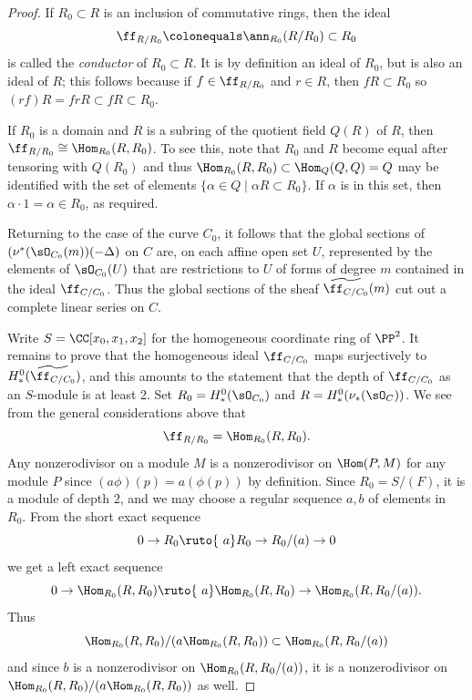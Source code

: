 \begin{proof}
If $R_{0}\subset R$ is an inclusion of commutative rings, then the ideal
$$\ff_{R/R_{0}} \colonequals  \ann_{R_{0}}(R/R_{0})\subset R_{0}$$ 
is called the \emph{conductor} of $R_{0}\subset R$.
%
It is by
definition an ideal of $R_{0}$, but is also an ideal of $R$; this follows
because if $f\in \ff_{R/R_{0}}$ and $r\in R$, then $fR\subset R_{0}$ so
 $(rf)R = frR \subset fR \subset R_{0}$.

If $R_{0}$ is a domain and $R$ is a subring of the quotient field $Q(R)$
of $R$, then
 $\ff_{R/R_{0}} \cong \Hom_{R_{0}}(R, R_{0})$. To see this, note that
 $R_{0}$ and $R$ become
 equal after tensoring with $Q(R_{0})$ and thus
 $\Hom_{R_{0}}(R,R_{0}) \subset \Hom_{Q}(Q,Q) = Q$
 may be identified
 with the set of elements $\{\alpha\in Q\mid \alpha R \subset R_{0}\}$. If
 $\alpha$ is in this set, then
  $\alpha\cdot 1 = \alpha \in R_{0}$, as required.

Returning to the case of the curve $C_{0}$, it follows that the global
sections of $(\nu^{*}(\sO_{C_{0}}(m))( -\Delta)$ on $C$
are, on each affine open set $U$, represented by the elements of
$\sO_{C_{0}}(U)$ that  are restrictions to $U$
of forms of degree $m$ contained in
the ideal $\ff_{C/C_{0}}$. Thus
the global sections of the sheaf $\widetilde{\ff_{C/C_{0}}}(m)$ cut out
a complete linear series on $C$.

Write $S =\CC[x_{0}, x_{1}, x_{2}]$ for the homogeneous coordinate ring
of $\PP^{2}$.
It remains to prove that the homogeneous ideal $\ff_{C/C_{0}}$ maps
surjectively to $H^{0}_{*}(\widetilde{\ff_{C/C_{0}}})$, and this amounts
to the
statement that the depth of $\ff_{C/C_{0}}$ as an $S$-module is 
at least 2.
Set $R_{0} = H^{0}_{*}(\sO_{C_{0}})$ and $R = H^{0}_{*}(\nu_{*} (\sO_{C}))$.
We see from the general considerations above that
$$
\ff_{R/R_{0}} = \Hom_{R_{0}}(R, R_{0}).
$$
Any nonzerodivisor on a module $M$
is a nonzerodivisor on $\Hom(P, M)$ for any module $P$ since $(a\phi)(p)
= a(\phi(p))$ by definition.
Since $R_{0} = S/(F)$, it is a module of depth 2, and we may choose a
regular sequence
$a,b$ of elements in~$R_{0}$. From the short exact sequence
$$
0\to R_{0}\ruto {\ a} R_{0}\to R_{0}/(a) \to 0
$$
we get a left exact sequence
$$
0\to \Hom_{R_{0}}(R,R_{0})\ruto {\ a} \Hom_{R_{0}}(R,R_{0})\to
\Hom_{R_{0}}(R,R_{0}/(a)).
$$
Thus
$$
\Hom_{R_{0}}(R,R_{0})/(a\Hom_{R_{0}}(R,R_{0})) \subset
\Hom_{R_{0}}(R,R_{0}/(a))
$$
and since $b$ is a nonzerodivisor on $\Hom_{R_{0}}(R,R_{0}/(a))$, it is
a nonzerodivisor
on $\Hom_{R_{0}}(R,R_{0})/(a\Hom_{R_{0}}(R,R_{0}))$ as well.
\end{proof}

